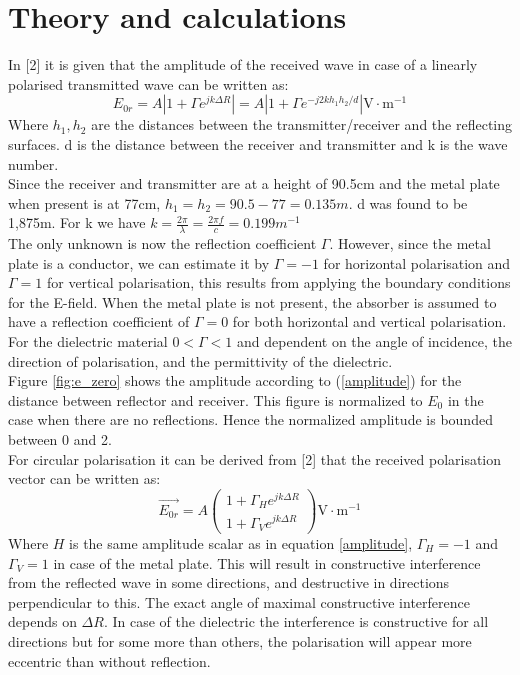\documentclass[11pt,a4paper]{article}
\begin{document}
\section{Theory and calculations}
In [2] it is given that the amplitude of the received wave in case of a linearly polarised transmitted wave can be written as:
\begin{equation}
E_{0r}=A|1+\Gamma e^{jk\Delta R}| = A|1+\Gamma e^{-j2kh_1 h_2/d}| \mathrm{V\cdot m^{-1}}
\label{amplitude}
\end{equation}
Where $h_1, h_2$ are the distances between the transmitter/receiver and the reflecting surfaces. d is the distance between the receiver and transmitter and k is the wave number.\\
Since the receiver and transmitter are at a height of 90.5cm and the metal plate when present is at 77cm, $h_1=h_2=90.5-77=0.135m$. d was found to be 1,875m. For k we have $k=\frac{2\pi}{\lambda}=\frac{2\pi f}{c}=0.199m^{-1}$\\
The only unknown is now the reflection coefficient $\Gamma$. However, since the metal plate is a conductor, we can estimate it by $\Gamma = -1$ for horizontal polarisation and $\Gamma = 1$ for vertical polarisation, this results from applying the boundary conditions for the E-field. When the metal plate is not present, the absorber  is assumed to have a reflection coefficient of $\Gamma = 0$ for both horizontal and vertical polarisation. For the dielectric material $0<\Gamma<1$ and dependent on the angle of incidence, the direction of polarisation, and the permittivity of the dielectric.\\
Figure \ref{fig:e_zero} shows the amplitude according to (\ref{amplitude}) for the distance between reflector and receiver. This figure is normalized to $E_0$ in the case when there are no reflections. Hence the normalized amplitude is bounded between 0 and 2.\\
For circular polarisation it can be derived from [2] that the received polarisation vector can be written as:
\begin{equation}
\overrightarrow{E_{0r}}=A
\begin{pmatrix} 1+\Gamma_{H}e^{jk\Delta R}\\ 1+\Gamma_{V}e^{jk\Delta R} \end{pmatrix} \mathrm{V\cdot m^{-1}}
\label{eq:amplitudeCircular}
\end{equation}
Where $H$ is the same amplitude scalar as in equation \ref{amplitude}, $\Gamma_{H}=-1$ and $\Gamma_{V}=1$ in case of the metal plate. This will result in constructive interference from the reflected wave in some directions, and destructive in directions perpendicular to this. The exact angle of maximal constructive interference depends on $\Delta R$. In case of the dielectric the interference is constructive for all directions but for some more than others, the polarisation will appear more eccentric than without reflection.
\end{document}

